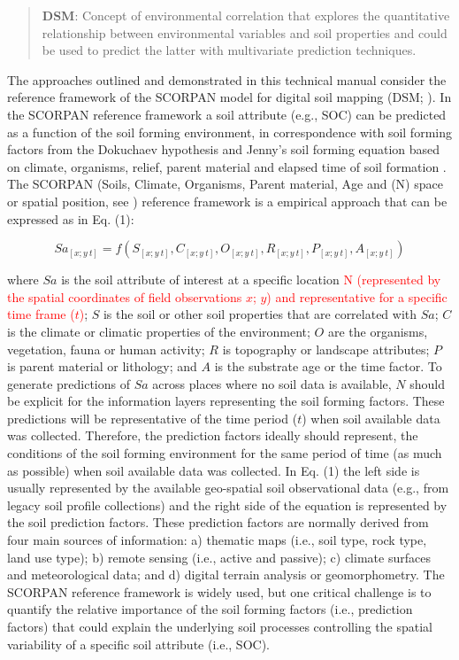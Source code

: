 \documentclass[10pt,b5paper,]{book}
\theoremstyle{definition}
\theoremstyle{definition}
\theoremstyle{definition}
\theoremstyle{remark}
\begin{document}
\begin{quote}
\textbf{DSM}: Concept of environmental correlation that explores the
quantitative relationship between environmental variables and soil
properties and could be used to predict the latter with multivariate
prediction techniques.
\end{quote}

The approaches outlined and demonstrated in this technical manual
consider the reference framework of the SCORPAN model for digital soil
mapping (DSM; \citet{mcbratney2003digital}). In the SCORPAN reference
framework a soil attribute (e.g., SOC) can be predicted as a function of
the soil forming environment, in correspondence with soil forming
factors from the Dokuchaev hypothesis and Jenny's soil forming equation
based on climate, organisms, relief, parent material and elapsed time of
soil formation \citep{Florinsky2012}. The SCORPAN (Soils, Climate,
Organisms, Parent material, Age and (N) space or spatial position, see
\cite{mcbratney2003digital}) reference framework is a empirical approach
that can be expressed as in Eq. (1):

\begin{equation}
Sa_{[x; y ~ t]}
=f(S_{[x; y ~ t]},C_{[x; y ~ t]},O_{[x; y ~ t]},R_{[x; y ~ t]},P_{[x;
y ~ t]},A_{[x; y ~ t]})
\end{equation}

where \(Sa\) is the soil attribute of interest at a specific location
\textcolor{red}{N (represented by the spatial coordinates of field
observations $x$; $y$) and representative for a specific time frame
($t$)}; \(S\) is the soil or other soil properties that are correlated
with \(Sa\); \(C\) is the climate or climatic properties of the
environment; \(O\) are the organisms, vegetation, fauna or human
activity; \(R\) is topography or landscape attributes; \(P\) is parent
material or lithology; and \(A\) is the substrate age or the time
factor. To generate predictions of \(Sa\) across places where no soil
data is available, \(N\) should be explicit for the information layers
representing the soil forming factors. These predictions will be
representative of the time period (\(t\)) when soil available data was
collected. Therefore, the prediction factors ideally should represent,
the conditions of the soil forming environment for the same period of
time (as much as possible) when soil available data was collected. In
Eq. (1) the left side is usually represented by the available
geo-spatial soil observational data (e.g., from legacy soil profile
collections) and the right side of the equation is represented by the
soil prediction factors. These prediction factors are normally derived
from four main sources of information: a) thematic maps (i.e., soil
type, rock type, land use type); b) remote sensing (i.e., active and
passive); c) climate surfaces and meteorological data; and d) digital
terrain analysis or geomorphometry. The SCORPAN reference framework is
widely used, but one critical challenge is to quantify the relative
importance of the soil forming factors (i.e., prediction factors) that
could explain the underlying soil processes controlling the spatial
variability of a specific soil attribute (i.e., SOC).
\end{document}
